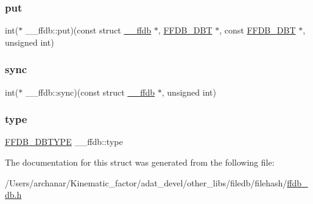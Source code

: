 \subsubsection{\texorpdfstring{put}{put}}
{\footnotesize\ttfamily int($\ast$ \+\_\+\+\_\+ffdb\+::put)(const struct \mbox{\hyperlink{struct____ffdb}{\+\_\+\+\_\+ffdb}} $\ast$, \mbox{\hyperlink{other__libs_2filedb_2filehash_2ffdb__db_8h_aa2e0984399491df0fdd20898ca8758f9}{F\+F\+D\+B\+\_\+\+D\+BT}} $\ast$, const \mbox{\hyperlink{other__libs_2filedb_2filehash_2ffdb__db_8h_aa2e0984399491df0fdd20898ca8758f9}{F\+F\+D\+B\+\_\+\+D\+BT}} $\ast$, unsigned int)}

\mbox{\label{struct____ffdb_ac62e77f33be0e087840288a34afa7505}} 
\subsubsection{\texorpdfstring{sync}{sync}}
{\footnotesize\ttfamily int($\ast$ \+\_\+\+\_\+ffdb\+::sync)(const struct \mbox{\hyperlink{struct____ffdb}{\+\_\+\+\_\+ffdb}} $\ast$, unsigned int)}

\mbox{\label{struct____ffdb_a97cc74bb16c35a0a927331f4e2aa0734}} 
\subsubsection{\texorpdfstring{type}{type}}
{\footnotesize\ttfamily \mbox{\hyperlink{other__libs_2filedb_2filehash_2ffdb__db_8h_ad525b587adc6d7028c6f7bf7e8204185}{F\+F\+D\+B\+\_\+\+D\+B\+T\+Y\+PE}} \+\_\+\+\_\+ffdb\+::type}



The documentation for this struct was generated from the following file\+:\begin{DoxyCompactItemize}
\item 
/\+Users/archanar/\+Kinematic\+\_\+factor/adat\+\_\+devel/other\+\_\+libs/filedb/filehash/\mbox{\hyperlink{other__libs_2filedb_2filehash_2ffdb__db_8h}{ffdb\+\_\+db.\+h}}\end{DoxyCompactItemize}
